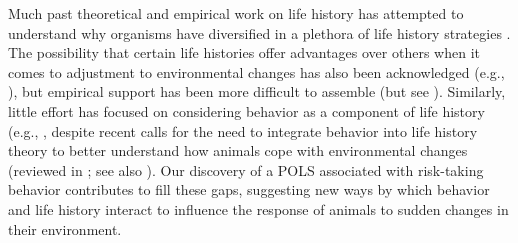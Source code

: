 Much past theoretical and empirical work on life history has
attempted to understand why organisms have diversified in a
plethora of life history strategies \citep{stearns1992evolution}. The possibility
that certain life histories offer advantages over others when it
comes to adjustment to environmental changes has also been
acknowledged (e.g., \citet{Saether2003}), but empirical
support has been more difficult to assemble (but see \citet{Sol2012a, Sol2014}). 
Similarly, little effort has focused on considering
behavior as a component of life history (e.g., \citet{Blumstein2006, Moller2012}, 
despite recent calls for the need
to integrate behavior into life history theory to better understand
how animals cope with environmental changes (reviewed in 
\citet{Sol2016}; see also \citet{Estrada2016}). Our discovery
of a POLS associated with risk-taking behavior contributes
to fill these gaps, suggesting new ways by which behavior
and life history interact to influence the response of animals to
sudden changes in their environment.


